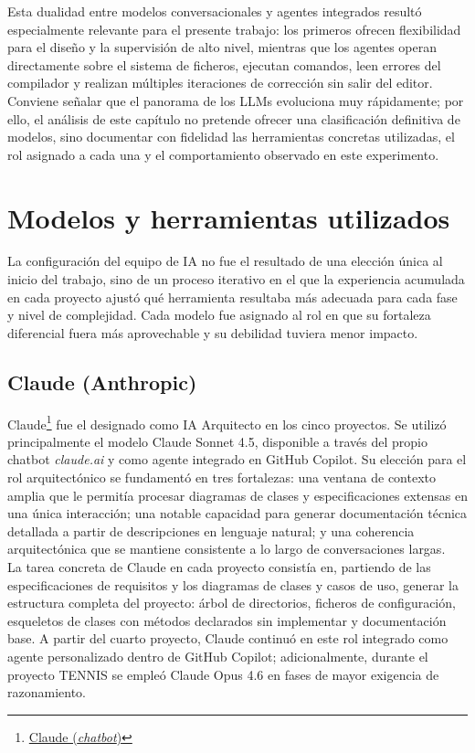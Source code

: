 Esta dualidad entre modelos conversacionales y agentes integrados resultó especialmente relevante para el presente trabajo: los primeros ofrecen flexibilidad para el diseño y la supervisión de alto nivel, mientras que los agentes operan directamente sobre el sistema de ficheros, ejecutan comandos, leen errores del compilador y realizan múltiples iteraciones de corrección sin salir del editor. Conviene señalar que el panorama de los \ac{LLMs} evoluciona muy rápidamente; por ello, el análisis de este capítulo no pretende ofrecer una clasificación definitiva de modelos, sino documentar con fidelidad las herramientas concretas utilizadas, el rol asignado a cada una y el comportamiento observado en este experimento.

\section{Modelos y herramientas utilizados} \label{sec:models-description}

La configuración del equipo de \ac{IA} no fue el resultado de una elección única al inicio del trabajo, sino de un proceso iterativo en el que la experiencia acumulada en cada proyecto ajustó qué herramienta resultaba más adecuada para cada fase y nivel de complejidad.
Cada modelo fue asignado al rol en que su fortaleza diferencial fuera más aprovechable y su debilidad tuviera menor impacto.

\subsection{Claude (Anthropic)} \label{subsec:claude}

Claude\footnote{\href{https://claude.ai}{Claude (\textit{chatbot})}} fue el designado como \ac{IA} Arquitecto en los cinco proyectos. Se utilizó principalmente el modelo Claude Sonnet 4.5, disponible a través del propio chatbot \textit{claude.ai} y como agente integrado en GitHub Copilot. Su elección para el rol arquitectónico se fundamentó en tres fortalezas: una ventana de contexto amplia que le permitía procesar diagramas de clases y especificaciones extensas en una única interacción; una notable capacidad para generar documentación técnica detallada a partir de descripciones en lenguaje natural; y una coherencia arquitectónica que se mantiene consistente a lo largo de conversaciones largas.\\

La tarea concreta de Claude en cada proyecto consistía en, partiendo de las especificaciones de requisitos y los diagramas de clases y casos de uso, generar la estructura completa del proyecto: árbol de directorios, ficheros de configuración, esqueletos de clases con métodos declarados sin implementar y documentación base. A partir del cuarto proyecto, Claude continuó en este rol integrado como agente personalizado dentro de GitHub Copilot; adicionalmente, durante el proyecto \ac{TENNIS} se empleó Claude Opus 4.6 en fases de mayor exigencia de razonamiento.

